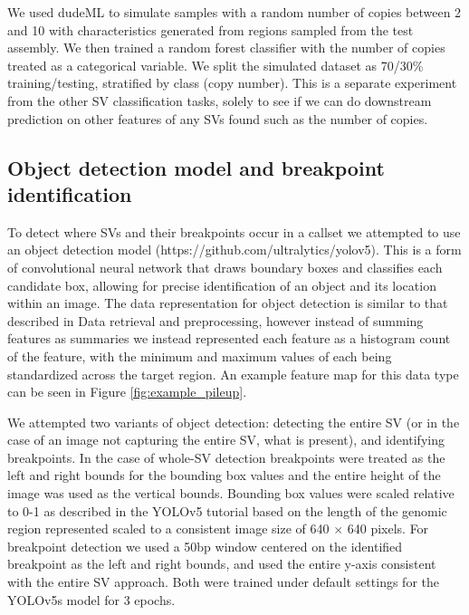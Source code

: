 We used dudeML \cite{hillDeepLearningApproach2019} to simulate samples with a random number of copies between 2 and 10 with characteristics generated from regions sampled from the test assembly. We then trained a random forest classifier with the number of copies treated as a categorical variable. We split the simulated dataset as 70/30\% training/testing, stratified by class (copy number). This is a separate experiment from the other SV classification tasks, solely to see if we can do downstream prediction on other features of any SVs found such as the number of copies.

\subsection{Object detection model and breakpoint identification}

To detect where SVs and their breakpoints occur in a callset we attempted to use an object detection model (https://github.com/ultralytics/yolov5). This is a form of convolutional neural network that draws boundary boxes and classifies each candidate box, allowing for precise identification of an object and its location within an image. The data representation for object detection is similar to that described in Data retrieval and preprocessing, however instead of summing features as summaries we instead represented each feature as a histogram count of the feature, with the minimum and maximum values of each being standardized across the target region. An example feature map for this data type can be seen in Figure \ref{fig:example_pileup}. 

We attempted two variants of object detection: detecting the entire SV (or in the case of an image not capturing the entire SV, what is present), and identifying breakpoints. In the case of whole-SV detection breakpoints were treated as the left and right bounds for the bounding box values and the entire height of the image was used as the vertical bounds. Bounding box values were scaled relative to 0-1 as described in the YOLOv5 tutorial based on the length of the genomic region represented scaled to a consistent image size of 640 $\times$ 640 pixels. For breakpoint detection we used a 50bp window centered on the identified breakpoint as the left and right bounds, and used the entire y-axis consistent with the entire SV approach. Both were trained under default settings for the YOLOv5s model for 3 epochs.

